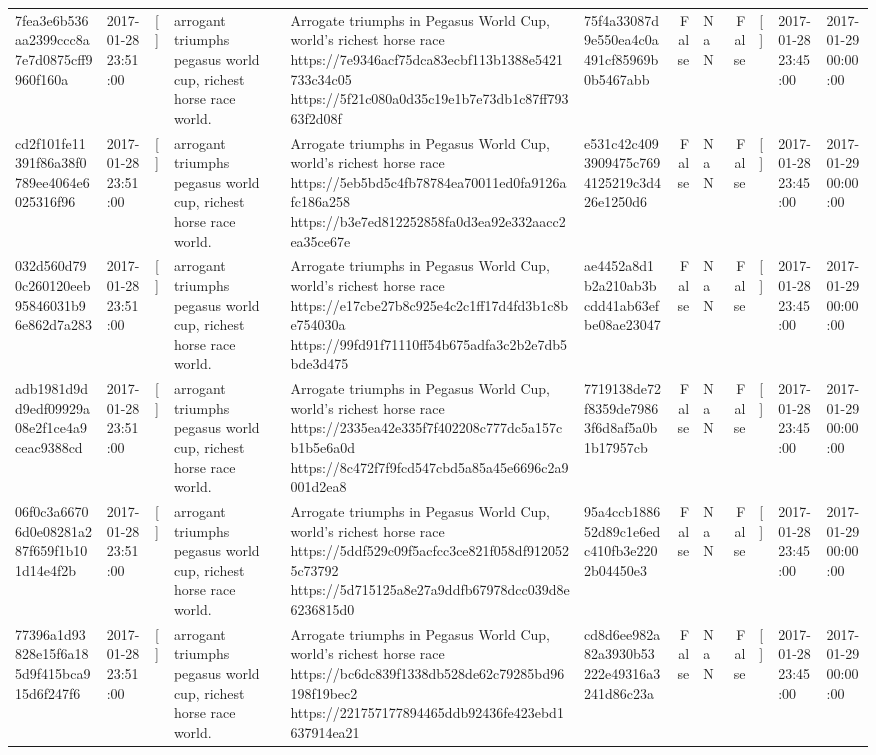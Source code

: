 \begin{tabular}{llllllrlrlll}
7fea3e6b536aa2399ccc8a7e7d0875cff9960f160a & 2017-01-28 23:51:00 & [] & arrogant triumphs pegasus world cup, richest horse race world. & Arrogate triumphs in Pegasus World Cup, world's richest horse race https://7e9346acf75dca83ecbf113b1388e5421733c34c05 https://5f21c080a0d35c19e1b7e73db1c87ff79363f2d08f & 75f4a33087d9e550ea4c0a491cf85969b0b5467abb & False & NaN & False & [] & 2017-01-28 23:45:00 & 2017-01-29 00:00:00 \\
cd2f101fe11391f86a38f0789ee4064e6025316f96 & 2017-01-28 23:51:00 & [] & arrogant triumphs pegasus world cup, richest horse race world. & Arrogate triumphs in Pegasus World Cup, world's richest horse race https://5eb5bd5c4fb78784ea70011ed0fa9126afc186a258 https://b3e7ed812252858fa0d3ea92e332aacc2ea35ce67e & e531c42c4093909475c7694125219c3d426e1250d6 & False & NaN & False & [] & 2017-01-28 23:45:00 & 2017-01-29 00:00:00 \\
032d560d790c260120eeb95846031b96e862d7a283 & 2017-01-28 23:51:00 & [] & arrogant triumphs pegasus world cup, richest horse race world. & Arrogate triumphs in Pegasus World Cup, world's richest horse race https://e17cbe27b8c925e4c2c1ff17d4fd3b1c8be754030a https://99fd91f71110ff54b675adfa3c2b2e7db5bde3d475 & ae4452a8d1b2a210ab3bcdd41ab63efbe08ae23047 & False & NaN & False & [] & 2017-01-28 23:45:00 & 2017-01-29 00:00:00 \\
adb1981d9dd9edf09929a08e2f1ce4a9ceac9388cd & 2017-01-28 23:51:00 & [] & arrogant triumphs pegasus world cup, richest horse race world. & Arrogate triumphs in Pegasus World Cup, world's richest horse race https://2335ea42e335f7f402208c777dc5a157cb1b5e6a0d https://8c472f7f9fcd547cbd5a85a45e6696c2a9001d2ea8 & 7719138de72f8359de79863f6d8af5a0b1b17957cb & False & NaN & False & [] & 2017-01-28 23:45:00 & 2017-01-29 00:00:00 \\
06f0c3a66706d0e08281a287f659f1b101d14e4f2b & 2017-01-28 23:51:00 & [] & arrogant triumphs pegasus world cup, richest horse race world. & Arrogate triumphs in Pegasus World Cup, world's richest horse race https://5ddf529c09f5acfcc3ce821f058df9120525c73792 https://5d715125a8e27a9ddfb67978dcc039d8e6236815d0 & 95a4ccb188652d89c1e6edc410fb3e2202b04450e3 & False & NaN & False & [] & 2017-01-28 23:45:00 & 2017-01-29 00:00:00 \\
77396a1d93828e15f6a185d9f415bca915d6f247f6 & 2017-01-28 23:51:00 & [] & arrogant triumphs pegasus world cup, richest horse race world. & Arrogate triumphs in Pegasus World Cup, world's richest horse race https://bc6dc839f1338db528de62c79285bd96198f19bec2 https://221757177894465ddb92436fe423ebd1637914ea21 & cd8d6ee982a82a3930b53222e49316a3241d86c23a & False & NaN & False & [] & 2017-01-28 23:45:00 & 2017-01-29 00:00:00 \\

\end{tabular}
